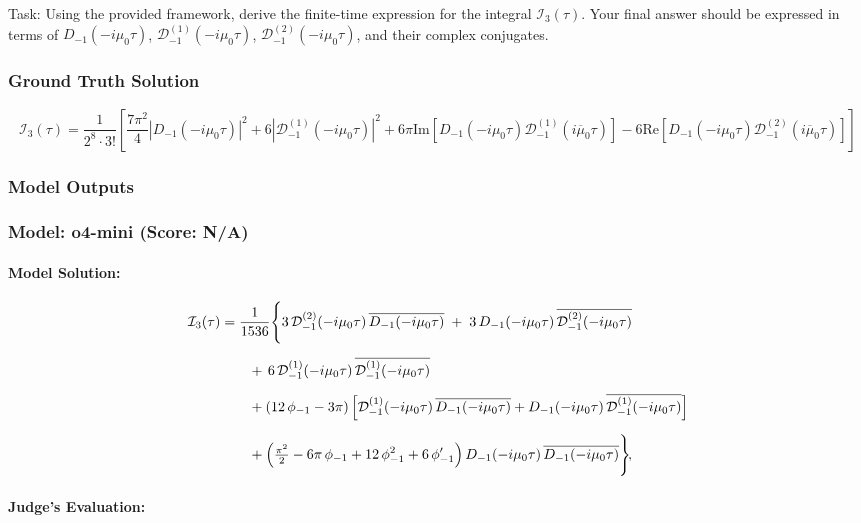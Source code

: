 \documentclass[10pt]{article}
\begin{document}
Task:
Using the provided framework, derive the finite-time expression for the integral $\mathcal{I}_3(\tau)$. Your final answer should be expressed in terms of $D_{-1}(-i\mu_0\tau)$, $\mathcal{D}^{(1)}_{-1}(-i\mu_0\tau)$, $\mathcal{D}^{(2)}_{-1}(-i\mu_0\tau)$, and their complex conjugates.

\subsubsection*{Ground Truth Solution}
\[ \boxed{\mathcal{I}_{3}(\tau) = \frac{1}{2^8 \cdot 3!}\left[\frac{7\pi^2}{4}\left|D_{-1}\left(-i\mu_{0}\tau\right)\right|^{2}+6\left|\mathcal{D}^{\left(1\right)}_{-1}\left(-i\mu_{0}\tau\right)\right|^{2}+6\pi\mathrm{Im}\left[D_{-1}\left(-i\mu_{0}\tau\right)\mathcal{D}^{\left(1\right)}_{-1}\left(i\overline\mu_0\tau\right)\right]-6\mathrm{Re}\left[D_{-1}\left(-i\mu_{0}\tau\right)\mathcal{D}^{\left(2\right)}_{-1}\left(i\overline\mu_0\tau\right)\right]\right]} \]

\subsubsection*{Model Outputs}
\subsubsection*{Model: o4-mini (Score: N/A)}
\paragraph*{Model Solution:}
\[ \begin{aligned}
\mathcal I_{3}(\tau)
&=\frac{1}{1536}\Biggl\{
3\,\mathcal D^{(2)}_{-1}(-i\mu_{0}\tau)\,
\overline{D_{-1}(-i\mu_{0}\tau)}
\;+\;
3\,D_{-1}(-i\mu_{0}\tau)\,
\overline{\mathcal D^{(2)}_{-1}(-i\mu_{0}\tau)}
\\[6pt]
&\qquad
+\,6\,\mathcal D^{(1)}_{-1}(-i\mu_{0}\tau)\,
\overline{\mathcal D^{(1)}_{-1}(-i\mu_{0}\tau)}
\\[6pt]
&\qquad
+(12\,\phi_{-1}-3\pi)\,\Bigl[
\mathcal D^{(1)}_{-1}(-i\mu_{0}\tau)\,
\overline{D_{-1}(-i\mu_{0}\tau)}
+
D_{-1}(-i\mu_{0}\tau)\,
\overline{\mathcal D^{(1)}_{-1}(-i\mu_{0}\tau)}
\Bigr]
\\[6pt]
&\qquad
+\Bigl(\tfrac{\pi^{2}}{2}-6\pi\,\phi_{-1}
+12\,\phi_{-1}^{2}+6\,\phi_{-1}'\Bigr)\,
D_{-1}(-i\mu_{0}\tau)\,
\overline{D_{-1}(-i\mu_{0}\tau)}
\Biggr\}\!,
\end{aligned} \]

\paragraph*{Judge's Evaluation:}
\end{document}
